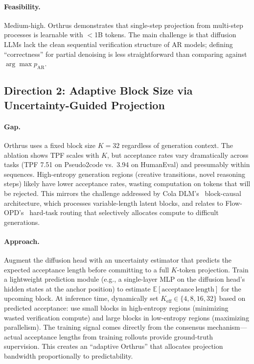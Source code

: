 \documentclass[11pt,a4paper]{article}
\begin{document}
\paragraph{Feasibility.} Medium-high. Orthrus demonstrates that single-step projection from multi-step processes is learnable with $<$1B tokens. The main challenge is that diffusion LLMs lack the clean sequential verification structure of AR models; defining ``correctness'' for partial denoising is less straightforward than comparing against $\arg\max p_{\mathrm{AR}}$.

\subsection{Direction 2: Adaptive Block Size via Uncertainty-Guided Projection}

\paragraph{Gap.} Orthrus uses a fixed block size $K{=}32$ regardless of generation context. The ablation shows TPF scales with $K$, but acceptance rates vary dramatically across tasks (TPF 7.51 on Pseudo2code vs.\ 3.94 on HumanEval) and presumably within sequences. High-entropy generation regions (creative transitions, novel reasoning steps) likely have lower acceptance rates, wasting computation on tokens that will be rejected. This mirrors the challenge addressed by Cola DLM's~\cite{coladlm} block-causal architecture, which processes variable-length latent blocks, and relates to Flow-OPD's~\cite{flowopd} hard-task routing that selectively allocates compute to difficult generations.

\paragraph{Approach.} Augment the diffusion head with an uncertainty estimator that predicts the expected acceptance length before committing to a full $K$-token projection. Train a lightweight prediction module (e.g., a single-layer MLP on the diffusion head's hidden states at the anchor position) to estimate $\mathbb{E}[\mathrm{acceptance\ length}]$ for the upcoming block. At inference time, dynamically set $K_{\mathrm{eff}} \in \{4, 8, 16, 32\}$ based on predicted acceptance: use small blocks in high-entropy regions (minimizing wasted verification compute) and large blocks in low-entropy regions (maximizing parallelism). The training signal comes directly from the consensus mechanism---actual acceptance lengths from training rollouts provide ground-truth supervision. This creates an ``adaptive Orthrus'' that allocates projection bandwidth proportionally to predictability.
\end{document}
